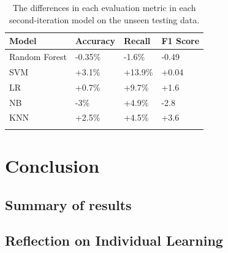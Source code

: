 \documentclass[12pt]{report}
\begin{document}
\pagebreak 
\begin{longtable}{ | p{} | p{} | p{} | p{} | }
    \hline
    \cellcolor{blue!25} Model & \cellcolor{blue!25} Accuracy & \cellcolor{blue!25} Recall & \cellcolor{blue!25} F1 Score\\
    \hline
    Random Forest & \cellcolor{red!25} -0.35\% & \cellcolor{red!25}-1.6\% & \cellcolor{red!25} -0.49\\ 
    \hline
    SVM & \cellcolor{green!18}+3.1\% & \cellcolor{green!18}+13.9\% & \cellcolor{green!18}+0.04\\ 
    \hline
    LR & \cellcolor{green!18}+0.7\% & \cellcolor{green!18}+9.7\% & \cellcolor{green!18}+1.6\\
    \hline
    NB & \cellcolor{red!25}-3\% & \cellcolor{green!18}+4.9\% & \cellcolor{red!25}-2.8\\
    \hline
    KNN & \cellcolor{green!18}+2.5\% & \cellcolor{green!18}+4.5\% & \cellcolor{green!18}+3.6\\
    \hline
    \caption{The differences in each evaluation metric in each second-iteration model on the unseen testing data.}\label{tab:Improvements}
\end{longtable}



\chapter{Conclusion}


\section{Summary of results} 




\section{Reflection on Individual Learning}
\end{document}

